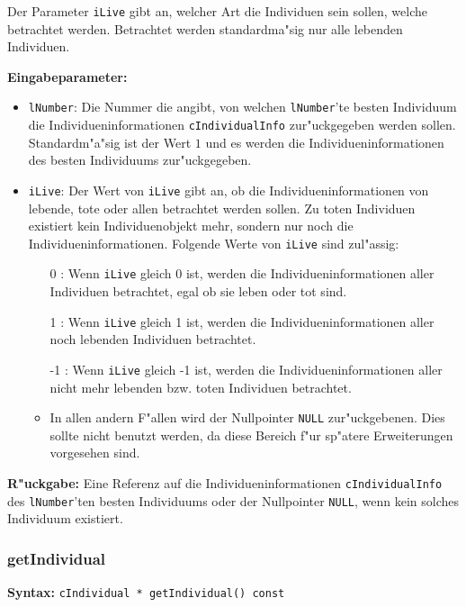 Der Parameter \verb|iLive| gibt an, welcher Art die Individuen sein sollen, welche betrachtet werden. Betrachtet werden standardma"sig nur alle lebenden Individuen.

\bigskip\noindent
\textbf{Eingabeparameter:}
\begin{itemize}
 \item \verb|lNumber|: Die Nummer die angibt, von welchen \verb|lNumber|'te besten Individuum die Individueninformationen \verb|cIndividualInfo| zur"uckgegeben werden sollen. Standardm"a"sig ist der Wert $1$ und es werden die Individueninformationen des besten Individuums zur"uckgegeben.
 \item \verb|iLive|: Der Wert von \verb|iLive| gibt an, ob die Individueninformationen von lebende, tote oder allen betrachtet werden sollen. Zu toten Individuen existiert kein Individuenobjekt mehr, sondern nur noch die Individueninformationen. Folgende Werte von \verb|iLive| sind zul"assig:
 \begin{itemize}
  \item [0]: Wenn \verb|iLive| gleich 0 ist, werden die Individueninformationen aller Individuen betrachtet, egal ob sie leben oder tot sind.
  \item [1]: Wenn \verb|iLive| gleich 1 ist, werden die Individueninformationen aller noch lebenden Individuen betrachtet.
  \item [-1]: Wenn \verb|iLive| gleich -1 ist, werden die Individueninformationen aller nicht mehr lebenden bzw. toten Individuen betrachtet.
  \item In allen andern F"allen wird der Nullpointer \verb|NULL| zur"uckgebenen. Dies sollte nicht benutzt werden, da diese Bereich f"ur sp"atere Erweiterungen vorgesehen sind.
 \end{itemize}
\end{itemize}

\bigskip\noindent
\textbf{R"uckgabe:} Eine Referenz auf die Individueninformationen \verb|cIndividualInfo| des \verb|lNumber|'ten besten Individuums oder der Nullpointer \verb|NULL|, wenn kein solches Individuum existiert.


\subsubsection{getIndividual}

\textbf{Syntax:} \verb|cIndividual * getIndividual() const| \\

